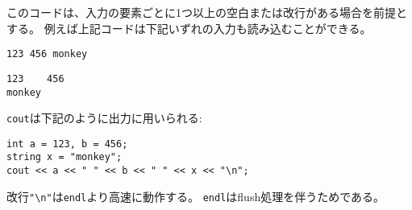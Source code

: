 \begin{comment}
This kind of code always works,
assuming that there is at least one space
or newline between each element in the input.
For example, the above code can read
both of the following inputs:
\end{comment}

このコードは、入力の要素ごとに1つ以上の空白または改行がある場合を前提とする。
例えば上記コードは下記いずれの入力も読み込むことができる。

\begin{lstlisting}
123 456 monkey
\end{lstlisting}
\begin{lstlisting}
123    456
monkey
\end{lstlisting}

\begin{comment}
The \texttt{cout} stream is used for output
as follows:
\end{comment}

\texttt{cout}は下記のように出力に用いられる:
\begin{lstlisting}
int a = 123, b = 456;
string x = "monkey";
cout << a << " " << b << " " << x << "\n";
\end{lstlisting}

\begin{comment}
Input and output is sometimes
a bottleneck in the program.
The following lines at the beginning of the code
make input and output more efficient:
\begin{comment}

入出力はしばしばプログラムのボトルネックになりうる。
下記をコードの先頭で実行することで、入出力効率は向上する。

\begin{lstlisting}
ios::sync_with_stdio(0);
cin.tie(0);
\end{lstlisting}

\begin{comment}
Note that the newline \texttt{"\textbackslash n"}
works faster than \texttt{endl},
because \texttt{endl} always causes
a flush operation.

The C functions \texttt{scanf}
and \texttt{printf} are an alternative
to the C++ standard streams.
They are usually a bit faster,
but they are also more difficult to use.
The following code reads two integers from the input:
\end{comment}

改行\texttt{"\textbackslash n"}は\texttt{endl}より高速に動作する。
\texttt{endl}はflush処理を伴うためである。

